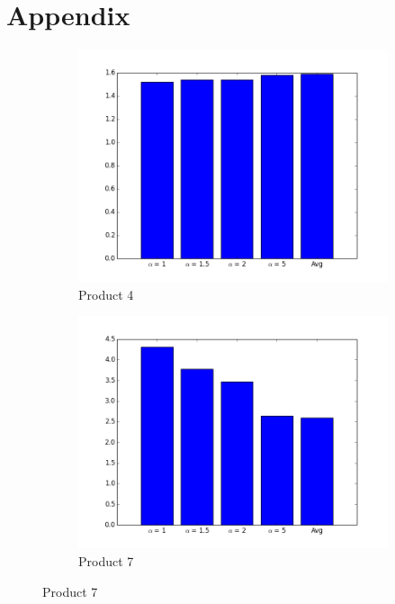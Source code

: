 \documentclass{article}
\begin{document}
\section{Appendix}
\begin{figure}[htp]
\centering
\begin{subfigure}{0.49\textwidth}
\centering
\includegraphics[width=1\textwidth]{Graphs/Product4}
\caption{Product 4}
\label{fig:product4}
\end{subfigure}
\begin{subfigure}{0.49\textwidth}
\centering
\includegraphics[width=1\textwidth]{Graphs/Product7}
\caption{Product 7}
\label{fig:product7}
\end{subfigure}



\end{figure}
\end{document}
